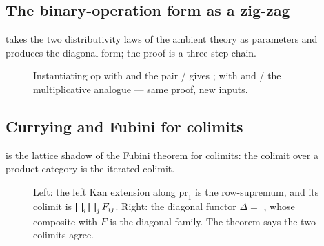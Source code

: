 \subsection{The binary-operation form as a zig-zag}

 takes the two distributivity laws of the ambient
theory as parameters and produces the diagonal form; the proof is a three-step chain.

\begin{figure}[ht]
\centering
{}
\caption{Instantiating $\mathrm{op}$ with  and the pair
/ gives ;
with  and / the multiplicative
analogue --- same proof, new inputs.}
\end{figure}

\subsection{Currying and Fubini for colimits}

 is the lattice shadow of the Fubini theorem for colimits: the
colimit over a product category is the iterated colimit.

\begin{figure}[ht]
\centering
{}
\qquad\qquad
{}
\caption{Left: the left Kan extension along $\mathrm{pr}_1$ is the row-supremum, and its
colimit is $\bigsqcup_i\bigsqcup_j F_{ij}$.  Right: the diagonal functor
$\Delta = $ , whose composite with $F$ is the diagonal
family.  The theorem says the two colimits agree.}
\end{figure}

